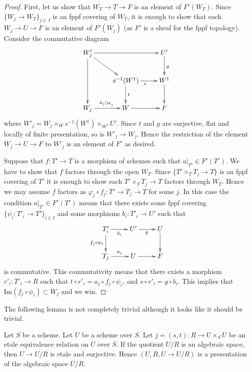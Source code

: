 \begin{proof}
\medskip\noindent
First, let us show that $W_T \to T \to F$ is an element of
$F'(W_T)$. Since $\{W_j \to W_T\}_{j \in J}$ is an
fppf covering of $W_T$, it is enough to show that
each $W_j \to U \to F$ is an element of $F'(W_j)$ (as $F'$ is a sheaf
for the fppf topology). Consider the commutative diagram
$$
\xymatrix{
W'_j \ar[rr] \ar[dd] \ar[rd] & & U' \ar[d]^g \\
& s^{-1}(W^1) \ar[r]_s \ar[d]^t & W^1 \ar[d] \\
W_j \ar[r]^{a_j|_{W_j}} & W \ar[r] & F
}
$$
where $W'_j = W_j \times_{W} s^{-1}(W^1) \times_{W^1} U'$.
Since $t$ and $g$ are surjective, flat and locally of finite
presentation, so is $W'_j \to W_j$. Hence the restriction of
the element $W_j \to U \to F$ to $W'_j$ is an element of $F'$
as desired.

\medskip\noindent
Suppose that $f : T' \to T$ is a morphism of schemes
such that $a|_{T'} \in F'(T')$. We have to show that
$f$ factors through the open $W_T$. Since
$\{T' \times_T T_j \to T\}$ is an fppf covering of $T'$
it is enough to show each $T' \times_T T_j \to T$
factors through $W_T$. Hence we may assume $f$ factors
as $\varphi_j \circ f_j : T' \to T_j \to T$ for some $j$.
In this case the condition $a|_{T'} \in F'(T')$ means that there exists
some fppf covering $\{\psi_i : T'_i \to T'\}_{i \in I}$ and some
morphisms $b_i : T'_i \to U'$ such that
$$
\xymatrix{
T'_i \ar[r]_{b_i} \ar[d]_{f_j \circ \psi_i} & U' \ar[r]_g & U \ar[d] \\
T_j \ar[r]^{a_j} & U \ar[r] & F
}
$$
is commutative. This commutativity means that there exists a
morphism $r'_i : T'_i \to R$ such that
$t \circ r'_i = a_j \circ f_j \circ \psi_i$, and
$s \circ r'_i = g \circ b_i$. This implies that
$\text{Im}(f_j \circ \psi_i) \subset W_j$ and we win.
\end{proof}

\noindent
The following lemma is not completely trivial although it looks
like it should be trivial.

\begin{lemma}
\label{lemma-when-it-works-it-works}
Let $S$ be a scheme. Let $U$ be a scheme over $S$.
Let $j = (s, t) : R \to U \times_S U$
be an etale equivalence relation on $U$ over $S$.
If the quotient $U/R$ is an algebraic space, then
$U \to U/R$ is etale and surjective. Hence
$(U, R, U \to U/R)$ is a presentation of the algebraic
space $U/R$.
\end{lemma}

